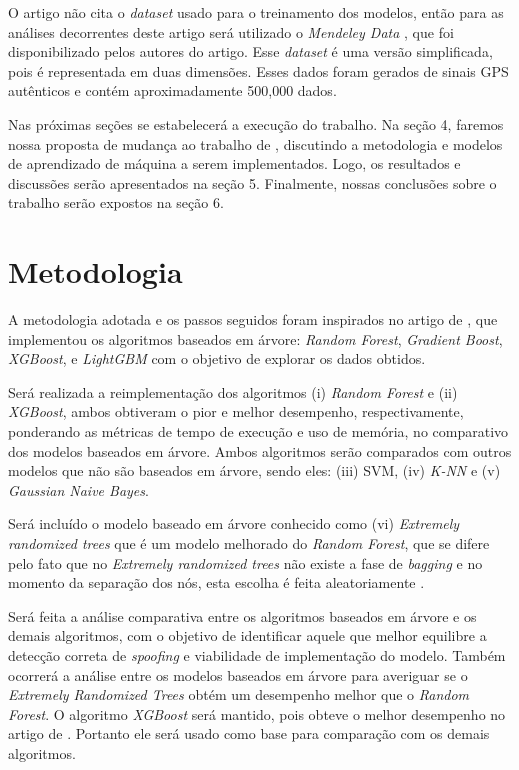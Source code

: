 \documentclass[12pt]{article}
\begin{document}
O artigo \cite{Aissou2021} não cita o \textit{dataset}
usado para o treinamento dos modelos, 
então para as análises decorrentes deste artigo
será utilizado o \textit{Mendeley Data} 
\cite{aissou2022dataset}, que foi disponibilizado pelos autores do artigo. 
Esse \textit{dataset} é uma versão simplificada,
pois é representada em duas dimensões. Esses dados foram gerados de sinais
GPS autênticos e contém aproximadamente 500,000 dados.

Nas próximas seções se estabelecerá a execução do trabalho.
Na seção 4, faremos nossa proposta de mudança
ao trabalho de \cite{Aissou2021}, discutindo a 
metodologia e modelos de aprendizado de máquina a
serem implementados. Logo, os resultados e 
discussões serão apresentados na seção 5.
Finalmente, nossas conclusões sobre o trabalho serão expostos na seção 6.

\section{Metodologia}
A metodologia adotada e os passos seguidos
foram inspirados no artigo de \cite{Aissou2021}, 
que implementou os algoritmos baseados em árvore: 
\textit{Random Forest}, \textit{Gradient Boost}, \textit{XGBoost}, e 
\textit{LightGBM} com o objetivo de explorar os dados obtidos.

Será realizada a reimplementação dos algoritmos
(i) \textit{Random Forest} e (ii) \textit{XGBoost},
ambos obtiveram o pior e melhor desempenho,
respectivamente, ponderando as métricas de tempo de execução
e uso de memória, no comparativo dos modelos baseados em árvore.
Ambos algoritmos serão comparados com outros
modelos que não são baseados em árvore,
sendo eles: (iii) SVM, (iv) \textit{K-NN} e
(v) \textit{Gaussian Naive Bayes}.

Será incluído o modelo baseado em árvore conhecido como
(vi) \textit{Extremely randomized trees} que é um modelo melhorado
do \textit{Random Forest}, que se difere pelo fato
que no \textit{Extremely randomized trees} não existe a fase
de \textit{bagging} e no momento da separação dos nós,
esta escolha é feita aleatoriamente \cite{geurtsExtremelyRandomizedTrees2006}.

Será feita a análise comparativa entre os algoritmos baseados em árvore
e os demais algoritmos, com o objetivo de identificar
aquele que melhor equilibre a detecção correta
de \textit{spoofing} e viabilidade de implementação do modelo.
Também ocorrerá a análise entre os modelos baseados em árvore
para averiguar se o \textit{Extremely Randomized Trees}
obtém um desempenho melhor que o \textit{Random Forest}.
O algoritmo \textit{XGBoost}
será mantido, pois obteve o melhor desempenho
no artigo de \cite{Aissou2021}.
Portanto ele será usado como base
para comparação com os demais algoritmos.
\end{document}
